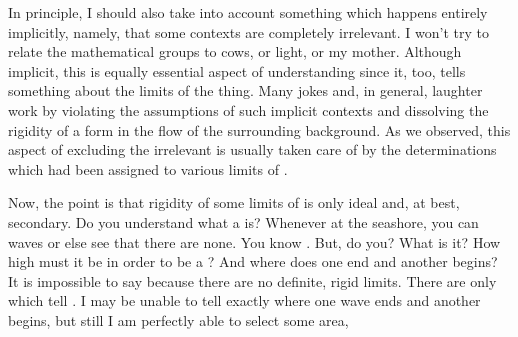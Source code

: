 In principle, I
should also take into account something which happens entirely implicitly,
namely, that some contexts are completely irrelevant. I won't try to relate the
mathematical groups to cows, or light, or my mother. Although implicit, this is
equally essential aspect of understanding since it, too, tells something about
the limits of the thing. Many jokes and, in general, laughter work by violating
the assumptions of such implicit contexts and dissolving the rigidity of a form
in the flow of the surrounding background.  As we observed, this aspect of
excluding the irrelevant is usually taken care of by the 
determinations which had been assigned to various limits of .


\pa Now, the point is that rigidity of some limits of  is only
ideal and, at best, secondary.  Do you understand what a  is?
Whenever at the seashore, you can  waves or else see that there
are none.  You know .  But, do you?  What is it?  How
high must it be in order to be a ?  And where does one  end
and another begins?  It is impossible to say because there are no definite,
rigid limits.  There are only  which tell .  I may be unable to tell exactly where one wave ends and
another begins, but still I am perfectly able to select some area,
